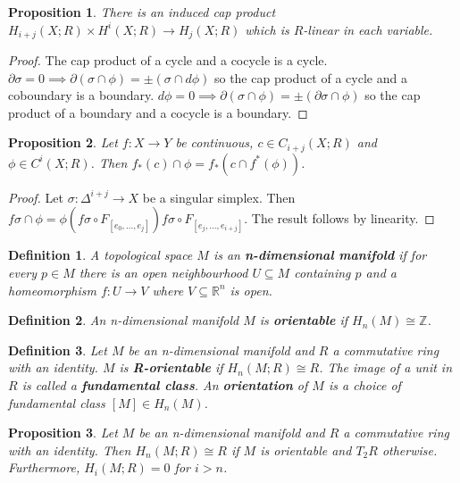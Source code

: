 \documentclass{report}
\newtheorem{definition}{Definition}
\newtheorem{proposition}{Proposition}
\begin{document}
\begin{proposition}
There is an induced cap product $H_{i+j}(X;R)\times H^i(X;R)\to H_j(X;R)$ which is $R$-linear in each variable.
\end{proposition}
\begin{proof}
The cap product of a cycle and a cocycle is a cycle. $\partial\sigma=0\implies\partial(\sigma\cap\phi)=\pm(\sigma\cap d\phi)$ so the cap product of a cycle and a coboundary is a boundary. $d\phi=0\implies\partial(\sigma\cap\phi)=\pm(\partial\sigma\cap\phi)$ so the cap product of a boundary and a cocycle is a boundary.
\end{proof}

\begin{proposition}
Let $f\colon X\to Y$ be continuous, $c\in C_{i+j}(X;R)$ and $\phi\in C^i(X;R)$. Then $f_*(c)\cap\phi=f_*(c\cap f^*(\phi))$.
\end{proposition}
\begin{proof}
Let $\sigma\colon\Delta^{i+j}\to X$ be a singular simplex. Then $f\sigma\cap\phi=\phi(f\sigma\circ F_{[e_0,...,e_j]})f\sigma\circ F_{[e_j,...,e_{i+j}]}$.
The result follows by linearity.
\end{proof}

\begin{definition}
A topological space $M$ is an \textbf{n-dimensional manifold} if for every $p\in M$ there is an open neighbourhood $U\subseteq M$ containing $p$ and a homeomorphism $f\colon U\to V$ where $V\subseteq\mathbb{R}^n$ is open.
\end{definition}

\begin{definition}
An n-dimensional manifold $M$ is \textbf{orientable} if $H_n(M)\cong \mathbb{Z}$.
\end{definition}

\begin{definition}
Let $M$ be an n-dimensional manifold and $R$ a commutative ring with an identity. $M$ is \textbf{R-orientable} if $H_n(M;R)\cong R$. The image of a unit in $R$ is called a \textbf{fundamental class}. An \textbf{orientation} of $M$ is a choice of fundamental class $[M]\in H_n(M)$.
\end{definition}

\begin{proposition}
Let $M$ be an n-dimensional manifold and $R$ a commutative ring with an identity. Then $H_n(M;R)\cong R$ if $M$ is orientable and $T_2R$ otherwise. Furthermore, $H_i(M;R)=0$ for $i>n$.
\end{proposition}
\end{document}
